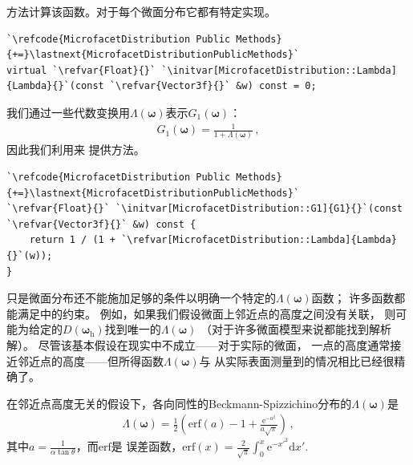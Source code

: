 方法计算该函数。对于每个微面分布它都有特定实现。
\begin{lstlisting}
`\refcode{MicrofacetDistribution Public Methods}{+=}\lastnext{MicrofacetDistributionPublicMethods}`
virtual `\refvar{Float}{}` `\initvar[MicrofacetDistribution::Lambda]{Lambda}{}`(const `\refvar{Vector3f}{}` &w) const = 0;
\end{lstlisting}

我们通过一些代数变换用$\Lambda({\bm\omega})$表示$G_1({\bm\omega})$：
\begin{align*}
    G_1({\bm\omega})=\frac{1}{1+\Lambda({\bm\omega})}\, ,
\end{align*}
因此我们利用来
提供方法。
\begin{lstlisting}
`\refcode{MicrofacetDistribution Public Methods}{+=}\lastnext{MicrofacetDistributionPublicMethods}`
`\refvar{Float}{}` `\initvar[MicrofacetDistribution::G1]{G1}{}`(const `\refvar{Vector3f}{}` &w) const {
    return 1 / (1 + `\refvar[MicrofacetDistribution::Lambda]{Lambda}{}`(w));
}
\end{lstlisting}

只是微面分布还不能施加足够的条件以明确一个特定的$\Lambda({\bm\omega})$函数；
许多函数都能满足中的约束。
例如，如果我们假设微面上邻近点的高度之间没有关联，
则可能为给定的$D({\bm\omega}_{\mathrm{h}})$找到唯一的$\Lambda({\bm\omega})$
（对于许多微面模型来说都能找到解析解）。
尽管该基本假设在现实中不成立——对于实际的微面，
一点的高度通常接近邻近点的高度——但所得函数$\Lambda({\bm\omega})$与
从实际表面测量到的情况相比已经很精确了。

在邻近点高度无关的假设下，各向同性的Beckmann-Spizzichino分布的$\Lambda({\bm\omega})$是
\begin{align}
    \Lambda({\bm\omega})=\frac{1}{2}\left(\mathrm{erf}(a)-1+\frac{\mathrm{e}^{-a^2}}{a\sqrt{\pi}}\right)\, ,
\end{align}
其中$a=\displaystyle\frac{1}{\alpha\tan\theta}$，而$\mathrm{erf}$是
误差函数，$\displaystyle\mathrm{erf}(x)=\frac{2}{\sqrt{\pi}}\int_0^x\mathrm{e}^{-x'^2}\mathrm{d}x'$.
